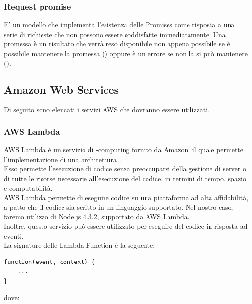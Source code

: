 \subsubsection{Request promise}
E' un modello che implementa l'esistenza delle Promises come risposta a una serie di richieste che non possono essere soddisfatte immediatamente. Una promessa è un risultato che verrà reso disponibile non appena possibile se è possibile mantenere la promessa () oppure è un errore se non la si può mantenere ().
\newpage
\subsection{Amazon Web Services}
Di seguito sono elencati i servizi AWS che dovranno essere utilizzati.

\subsubsection{AWS Lambda}
AWS Lambda è un servizio di -computing fornito da Amazon, il quale permette l'implementazione di una architettura . \\
Esso permette l'esecuzione di codice senza preoccuparsi della gestione di server o di tutte le risorse necessarie all'esecuzione del codice, in termini di tempo, spazio e computabilità. \\
AWS Lambda permette di eseguire codice su una piattaforma ad alta affidabilità, a patto che il codice sia scritto in un linguaggio supportato. Nel nostro caso, faremo utilizzo di Node.js 4.3.2, supportato da AWS Lambda. \\
Inoltre, questo servizio può essere utilizzato per eseguire del codice in risposta ad eventi. \\
La signature delle Lambda Function è la seguente:
\begin{verbatim}
function(event, context) {
    ...
}
\end{verbatim}
dove:
